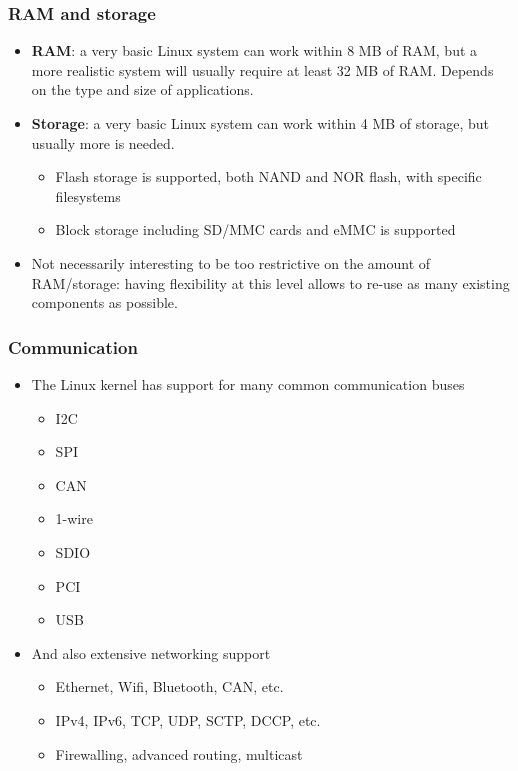 \begin{frame}
  \frametitle{RAM and storage}
  \begin{itemize}
  \item {\bf RAM}: a very basic Linux system can work within 8 MB of
    RAM, but a more realistic system will usually require at least 32
    MB of RAM. Depends on the type and size of applications.
  \item {\bf Storage}: a very basic Linux system can work within 4 MB
    of storage, but usually more is needed.
    \begin{itemize}
    \item Flash storage is supported, both NAND and NOR flash, with
      specific filesystems
    \item Block storage including SD/MMC cards and eMMC is supported
    \end{itemize}
  \item Not necessarily interesting to be too restrictive on the
    amount of RAM/storage: having flexibility at this level allows to
    re-use as many existing components as possible.
  \end{itemize}
\end{frame}

\begin{frame}
  \frametitle{Communication}
  \begin{itemize}
  \item The Linux kernel has support for many common communication
    buses
    \begin{itemize}
    \item I2C
    \item SPI
    \item CAN
    \item 1-wire
    \item SDIO
    \item PCI
    \item USB
    \end{itemize}
  \item And also extensive networking support
    \begin{itemize}
    \item Ethernet, Wifi, Bluetooth, CAN, etc.
    \item IPv4, IPv6, TCP, UDP, SCTP, DCCP, etc.
    \item Firewalling, advanced routing, multicast
    \end{itemize}
  \end{itemize}
\end{frame}

